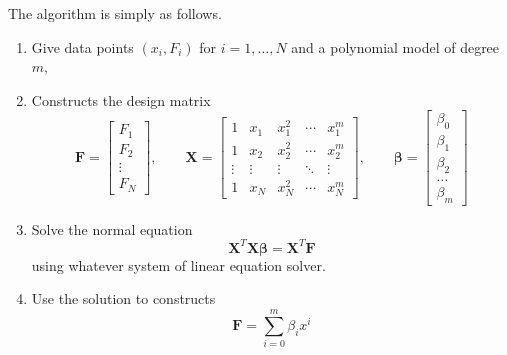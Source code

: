\documentclass[../../../main.tex]{subfiles}
\begin{document}
The algorithm is simply as follows.
\begin{enumerate}
    \item Give data points \((x_i, F_i)\) for \(i = 1, \dots, N\) and a polynomial model of degree \(m\),
    \item Constructs the design matrix
          \begin{equation*}
              \mathbf{F} =
              \begin{bmatrix}
                  F_1 \\ F_2 \\ \vdots \\ F_N
              \end{bmatrix},
              \qquad
              \mathbf{X} =
              \begin{bmatrix}
                  1      & x_1    & x_1^2  & \cdots & x_1^m  \\
                  1      & x_2    & x_2^2  & \cdots & x_2^m  \\
                  \vdots & \vdots & \vdots & \ddots & \vdots \\
                  1      & x_N    & x_N^2  & \cdots & x_N^m
              \end{bmatrix},
              \qquad
              \boldsymbol{\beta} =\begin{bmatrix}
                  \beta_0 \\ \beta_1 \\ \beta_2\\ \ldots \\ \beta_m
              \end{bmatrix}
          \end{equation*}
    \item Solve the normal equation
    \begin{equation*}
        \mathbf{X}^{T}\mathbf{X}\boldsymbol{\beta} = \mathbf{X}^{T}\mathbf{F}
    \end{equation*}
    using whatever system of linear equation solver.
    \item Use the solution to constructs
          \begin{equation*}
              \mathbf{F} = \sum_{i=0}^{m} \beta_i x^i
          \end{equation*}
\end{enumerate}
\end{document}
